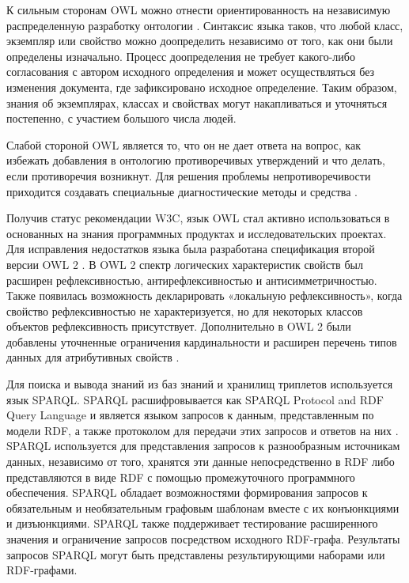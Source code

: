 К сильным сторонам OWL можно отнести ориентированность на независимую распределенную разработку онтологии \cite{bobillo2011fuzzy}. Синтаксис языка таков, что любой класс, экземпляр или свойство можно доопределить независимо от того, как они были определены изначально. Процесс доопределения не требует какого-либо согласования с автором исходного определения и может осуществляться без изменения документа, где зафиксировано исходное определение. Таким образом, знания об экземплярах, классах и свойствах могут накапливаться и уточняться постепенно, с участием большого числа людей.

Слабой стороной OWL является то, что он не дает ответа на вопрос, как избежать добавления в онтологию противоречивых утверждений и что делать, если противоречия возникнут. Для решения проблемы непротиворечивости приходится создавать специальные диагностические методы и средства \cite{deng2007measuring} .

Получив статус рекомендации W3C, язык OWL стал активно использоваться в основанных на знания программных продуктах и исследовательских проектах. Для исправления недостатков языка была разработана спецификация второй версии OWL 2 \cite{world2012owl} . В OWL 2 спектр логических характеристик свойств был расширен рефлексивностью, антирефлексивностью и антисимметричностью. Также появилась возможность декларировать «локальную рефлексивность», когда свойство рефлексивностью не характеризуется, но для некоторых классов объектов рефлексивность присутствует. Дополнительно в OWL 2 были добавлены уточненные ограничения кардинальности и расширен перечень типов данных для атрибутивных свойств \cite{golbreich2009owl}. 

Для поиска и вывода знаний из баз знаний и хранилищ триплетов используется язык SPARQL. SPARQL  расшифровывается как SPARQL Protocol and RDF Query Language и является  языком запросов к данным, представленным по модели RDF, а также протоколом для передачи этих запросов и ответов на них \cite{prud2008sparql}. SPARQL используется для представления запросов к разнообразным источникам данных, независимо от того, хранятся эти данные непосредственно в RDF либо представляются в виде RDF с помощью промежуточного программного обеспечения. SPARQL обладает возможностями формирования запросов к обязательным и необязательным графовым шаблонам вместе с их конъюнкциями и дизъюнкциями. SPARQL также поддерживает тестирование расширенного значения и ограничение запросов посредством исходного RDF-графа. Результаты запросов SPARQL могут быть представлены результирующими наборами или RDF-графами.


